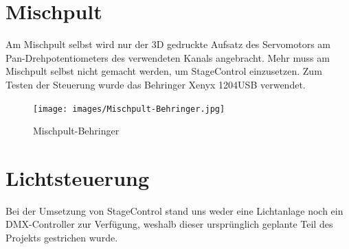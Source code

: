 \newpage
\section{Mischpult}
Am Mischpult selbst wird nur der 3D gedruckte Aufsatz des Servomotors am Pan-Drehpotentiometers des verwendeten Kanals angebracht. Mehr muss am Mischpult selbst nicht gemacht werden, um StageControl einzusetzen. Zum Testen der Steuerung wurde das Behringer Xenyx 1204USB verwendet.


\begin{figure}[H]
	\centering
	\texttt{[image: images/Mischpult-Behringer.jpg]}
	\caption[Mischpult-Behringer]{Mischpult-Behringer}
	\label{fig: Mischpult-Behringer}
\end{figure}


\section{Lichtsteuerung}
Bei der Umsetzung von StageControl stand uns weder eine Lichtanlage noch ein DMX-Controller zur Verfügung, weshalb dieser ursprünglich geplante Teil des Projekts gestrichen wurde.
